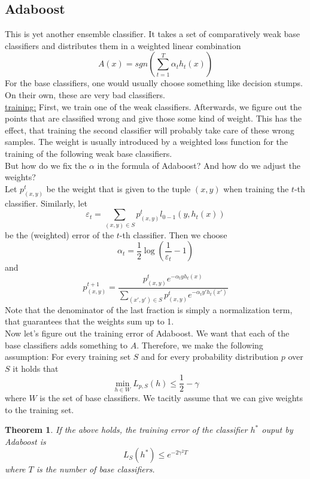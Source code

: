 \documentclass[a4paper, 12pt]{article}
\theoremstyle{plain}
\newtheorem{theorem}{Theorem}[subsection] %
\theoremstyle{definition}
\theoremstyle{lemma}
\theoremstyle{remark}
\theoremstyle{example}
\begin{document}
	\subsection{Adaboost}
	This is yet another ensemble classifier. It takes a set of comparatively weak base classifiers and distributes them in a weighted linear combination \[A(x) = sgn \left(\sum_{t=1}^T\alpha_t h_t(x)\right)\]
	For the base classifiers, one would usually choose something like decision stumps. On their own, these are very bad classifiers.\\
	\underline{training:} First, we train one of the weak classifiers. Afterwards, we figure out the points that are classified wrong and give those some kind of weight. This has the effect, that training the second classifier will probably take care of these wrong samples. The weight is usually introduced by a weighted loss function for the training of the following weak base classifiers.\\
	But how do we fix the $\alpha$ in the formula of Adaboost? And how do we adjust the weights?\\
	Let $p_{(x,y)}^t$ be the weight that is given to the tuple $(x,y)$ when training the $t$-th classifier. Similarly, let \[\varepsilon_t = \sum_{(x,y) \in S} p_{(x,y)}^t l_{0-1}(y,h_t(x))\] be the (weighted) error of the $t$-th classifier. Then we choose \[\alpha_t = \frac{1}{2} \log\left(\frac{1}{\varepsilon_t} - 1\right)\] and \[p_{(x,y)}^{t+1} = \frac{p_{(x,y)}^t e^{-\alpha_t y h_t(x)}}{\sum_{(x',y') \in S} p_{(x,y)}^t e^{-\alpha_t y' h_t(x')}}\] Note that the denominator of the last fraction is simply a normalization term, that guarantees that the weights sum up to 1.\\
	Now let's figure out the training error of Adaboost. We want that each of the base classifiers adds something to $A$. Therefore, we make the following assumption: For every training set $S$ and for every probability distribution $p$ over $S$ it holds that \[\min_{h \in W} L_{p,S}(h) \leq \frac{1}{2}-\gamma\] where $W$ is the set of base classifiers. We tacitly assume that we can give weights to the training set.
	\begin{theorem}
		If the above holds, the training error of the classifier $h^*$ ouput by Adaboost is \[L_S(h^*) \leq e^{-2\gamma^2 T}\] where $T$ is the number of base classifiers.
	\end{theorem}
\end{document}
